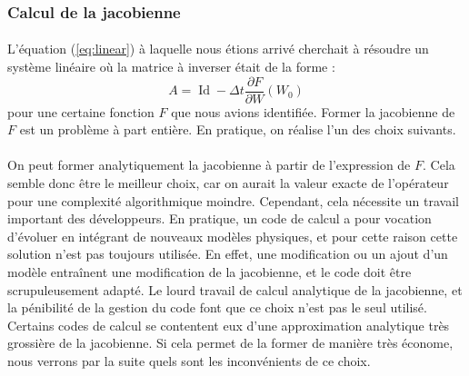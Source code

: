     \subsubsection{Calcul de la jacobienne}

      \paragraph{}
      L'équation (\ref{eq:linear}) à laquelle nous étions arrivé cherchait à résoudre un système linéaire où la matrice à inverser était de la forme :
      \[A = \operatorname{Id} - \Delta t\frac{\partial F}{\partial W}\left(W_0\right)\]
      pour une certaine fonction $F$ que nous avions identifiée.
      Former la jacobienne de $F$ est un problème à part entière.
      En pratique, on réalise l'un des choix suivants.

      \paragraph{}
      On peut former analytiquement la jacobienne à partir de l'expression de $F$.
      Cela semble donc être le meilleur choix, car on aurait la valeur exacte de l'opérateur pour une complexité algorithmique moindre.
      Cependant, cela nécessite un travail important des développeurs.
      En pratique, un code de calcul a pour vocation d'évoluer en intégrant de nouveaux modèles physiques, et pour cette raison cette solution n'est pas toujours utilisée.
      En effet, une modification ou un ajout d'un modèle entraînent une modification de la jacobienne, et le code doit être scrupuleusement adapté.
      Le lourd travail de calcul analytique de la jacobienne, et la pénibilité de la gestion du code font que ce choix n'est pas le seul utilisé.
      Certains codes de calcul se contentent eux d'une approximation analytique très grossière de la jacobienne.
      Si cela permet de la former de manière très économe, nous verrons par la suite quels sont les inconvénients de ce choix.

